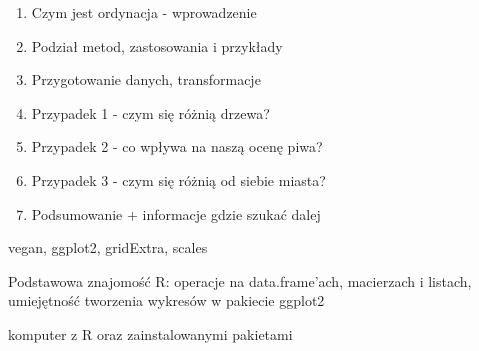 \documentclass[\main/boa.tex]{subfiles}
\begin{document}
\planwarsztatu
\begin{enumerate}
\item Czym jest ordynacja - wprowadzenie
\item Podział metod, zastosowania i przykłady
\item Przygotowanie danych, transformacje
\item Przypadek 1 - czym się różnią drzewa?
\item Przypadek 2 - co wpływa na naszą ocenę piwa?
\item Przypadek 3 - czym się różnią od siebie miasta?
\item Podsumowanie + informacje gdzie szukać dalej
\end{enumerate}	 

\pakiety vegan, ggplot2, gridExtra, scales

\umiejetnosci Podstawowa znajomość R: operacje na data.frame'ach, macierzach i listach, umiejętność tworzenia wykresów w pakiecie ggplot2

\wymagania komputer z R oraz zainstalowanymi pakietami
\end{document}
